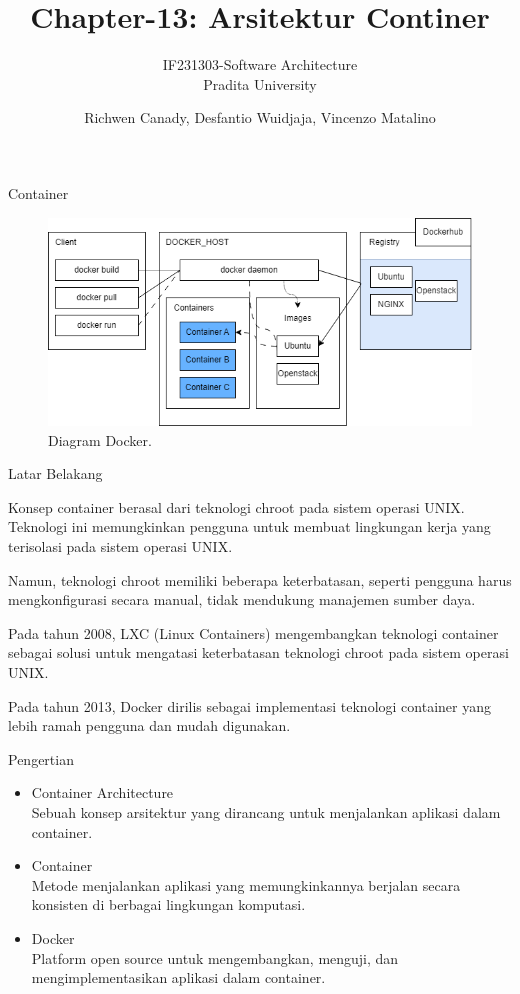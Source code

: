 \documentclass{beamer}
\title{Chapter-13: Arsitektur Continer}
\subtitle{IF231303-Software Architecture\\Pradita University}
\author{Richwen Canady, Desfantio Wuidjaja, Vincenzo Matalino}
\begin{document}
	
	\begin{frame}[plain]
		\maketitle
	\end{frame}
	
	\begin{frame}{Container}
		\begin{figure}[h]
			\centering
			\includegraphics[width=\textwidth]{DockerDiagram.png}
			\caption{Diagram Docker.}
			\label{fig:ContainerDiagram}
		\end{figure}
	\end{frame}
	
	\begin{frame}{Latar Belakang}
                \item Konsep container berasal dari teknologi chroot pada sistem operasi UNIX. Teknologi ini memungkinkan pengguna untuk membuat lingkungan kerja yang terisolasi pada sistem operasi UNIX.
                \item Namun, teknologi chroot memiliki beberapa keterbatasan, seperti pengguna harus mengkonfigurasi secara manual, tidak mendukung manajemen sumber daya.
                \item Pada tahun 2008, LXC (Linux Containers) mengembangkan teknologi container sebagai solusi untuk mengatasi keterbatasan teknologi chroot pada sistem operasi UNIX.
                \item Pada tahun 2013, Docker dirilis sebagai implementasi teknologi container yang lebih ramah pengguna dan mudah digunakan.
		\end{frame}

        \begin{frame}{Pengertian}
		\begin{itemize}
			\item Container Architecture
                \\Sebuah konsep arsitektur yang dirancang untuk menjalankan aplikasi dalam container.
                \item Container
                \\Metode menjalankan aplikasi yang memungkinkannya berjalan secara konsisten di berbagai lingkungan komputasi.
                \item Docker
                \\Platform open source untuk mengembangkan, menguji, dan mengimplementasikan aplikasi dalam container. 
		\end{itemize}
	\end{frame}
	
\end{document}
